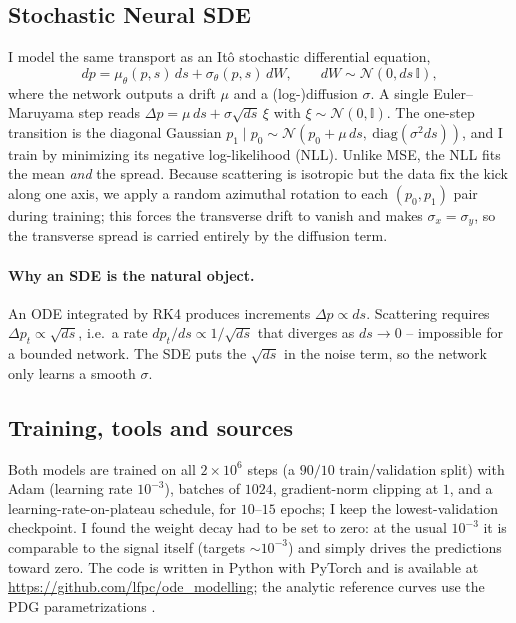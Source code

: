 \documentclass[11pt]{article}
\begin{document}
\subsection{Stochastic Neural SDE}
I model the same transport as an It\^o stochastic differential equation,
\begin{equation}
  dp = \mu_\theta(p,s)\,ds + \sigma_\theta(p,s)\,dW,\qquad dW\sim\mathcal N(0,ds\,\mathbb I),
\end{equation}
where the network outputs a drift $\mu$ and a (log-)diffusion $\sigma$. A single
Euler--Maruyama step reads $\Delta p=\mu\,ds+\sigma\sqrt{ds}\,\xi$ with
$\xi\sim\mathcal N(0,\mathbb I)$. The one-step transition is the diagonal Gaussian
$p_1\mid p_0\sim\mathcal N(p_0+\mu\,ds,\ \mathrm{diag}(\sigma^2 ds))$, and I train
by minimizing its negative log-likelihood (NLL). Unlike MSE, the NLL fits the
mean \emph{and} the spread. Because scattering is isotropic but the data fix the
kick along one axis, we apply a random azimuthal rotation to each $(p_0,p_1)$ pair
during training; this forces the transverse drift to vanish and makes
$\sigma_x=\sigma_y$, so the transverse spread is carried entirely by the
diffusion term.

\paragraph{Why an SDE is the natural object.} An ODE integrated by RK4 produces
increments $\Delta p\propto ds$. Scattering requires $\Delta p_t\propto\sqrt{ds}$,
i.e.\ a rate $dp_t/ds\propto1/\sqrt{ds}$ that diverges as $ds\to0$ -- impossible
for a bounded network. The SDE puts the $\sqrt{ds}$ in the noise term, so the
network only learns a smooth $\sigma$.

\subsection{Training, tools and sources}
Both models are trained on all $2\times10^6$ steps (a $90/10$ train/validation
split) with Adam (learning rate $10^{-3}$), batches of $1024$, gradient-norm
clipping at $1$, and a learning-rate-on-plateau schedule, for $10$--$15$ epochs;
I keep the lowest-validation checkpoint. I found the weight decay had to be set
to zero: at the usual $10^{-3}$ it is comparable to the signal itself (targets
$\sim10^{-3}$) and simply drives the predictions toward zero. The code is written
in Python with PyTorch \cite{pytorch} and is available at \url{https://github.com/lfpc/ode_modelling}; the analytic reference curves use the PDG
parametrizations \cite{pdg, highland}. 
\end{document}
